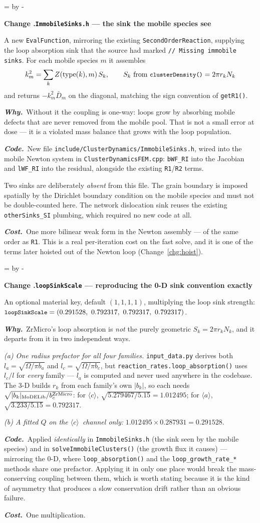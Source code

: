 \documentclass[11pt,a4paper]{article}
\newcommand{\code}[1]{\texttt{\small #1}}
\newcommand{\aloop}{\ensuremath{\langle a\rangle}}
\newcommand{\cloop}{\ensuremath{\langle c\rangle}}
\newcommand{\Om}{\ensuremath{\Omega}}
\newcommand{\needlines}[1]{%
  \par\dimen0=\pagegoal \advance\dimen0 by -\pagetotal
  \ifdim\dimen0<#1\baselineskip \newpage \fi}
\newcounter{chg}
\newcommand{\change}[1]{%
  \needlines{4}%
  \refstepcounter{chg}%
  \par\medskip\noindent
  {\bfseries\boldmath Change \thechg.\quad #1}%
  \par\nobreak\smallskip}
\newcommand{\why}[1]{\par\noindent\textbf{\itshape Why.}\ #1\par}
\newcommand{\impact}[1]{\par\noindent\textbf{\itshape Code.}\ #1\par}
\newcommand{\cost}[1]{\par\noindent\textbf{\itshape Cost.}\ #1\par}
\begin{document}
\change{\code{ImmobileSinks.h} --- the sink the mobile species see}
\label{chg:immobilesinks}
A new \code{EvalFunction}, mirroring the existing \code{SecondOrderReaction},
supplying the loop absorption sink that the source had marked
\code{// Missing immobile sinks}. For each mobile species $m$ it assembles
\[
  k^2_m = \sum_k Z(\text{type}(k), m)\, S_k , \qquad
  S_k \ \text{from}\ \code{clusterDensity()} = 2\pi r_k N_k
\]
and returns $-k^2_m \bar D_m$ on the diagonal, matching the sign convention of
\code{getR1()}.
\why{Without it the coupling is one-way: loops grow by absorbing mobile
defects that are never removed from the mobile pool. That is not a small
error at dose --- it is a violated mass balance that grows with the loop
population.}
\impact{New file \code{include/ClusterDynamics/ImmobileSinks.h}, wired into the
mobile Newton system in \code{ClusterDynamicsFEM.cpp}: \code{bWF\_RI} into the
Jacobian and \code{lWF\_RI} into the residual, alongside the existing
\code{R1}/\code{R2} terms.

Two sinks are deliberately \emph{absent} from this file. The grain boundary is
imposed spatially by the Dirichlet boundary condition on the mobile species and
must not be double-counted here. The network dislocation sink reuses the
existing \code{otherSinks\_SI} plumbing, which required no new code at all.}
\cost{One more bilinear weak form in the Newton assembly --- of the same order
as \code{R1}. This is a real per-iteration cost on the fast solve, and it is
one of the terms later hoisted out of the Newton loop
(Change~\ref{chg:hoist}).}

\change{\code{loopSinkScale} --- reproducing the 0-D sink convention exactly}
\label{chg:loopsinkscale}
An optional material key, default $(1,1,1,1)$, multiplying the loop sink
strength: $\code{loopSinkScale} = (0.291528,\ 0.792317,\ 0.792317,\ 0.792317)$.
\why{ZrMicro's loop absorption is \emph{not} the purely geometric
$S_k = 2\pi r_k N_k$, and it departs from it in two independent ways.

\emph{(a) One radius prefactor for all four families.} \code{input\_data.py}
derives both $l_a = \sqrt{\Om/\pi b_a}$ and $l_c = \sqrt{\Om/\pi b_c}$, but
\code{reaction\_rates.loop\_absorption()} uses $l_c/l$ for \emph{every}
family --- $l_a$ is computed and never used anywhere in the codebase. The 3-D
builds $r_k$ from each family's own $|b_k|$, so each needs
$\sqrt{|b_k|_{\rm MoDELib}/b_c^{\rm ZrMicro}}$: for \cloop,
$\sqrt{5.279467/5.15} = 1.012495$; for \aloop, $\sqrt{3.233/5.15} = 0.792317$.

\emph{(b) A fitted $Q$ on the \cloop\ channel only:}
$1.012495\times0.287931 = 0.291528$.}
\impact{Applied \emph{identically} in \code{ImmobileSinks.h} (the sink seen by
the mobile species) and in \code{solveImmobileClusters()} (the growth flux it
causes) --- mirroring the 0-D, where \code{loop\_absorption()} and the
\code{loop\_growth\_rate\_*} methods share one prefactor. Applying it in only
one place would break the mass-conserving coupling between them, which is
worth stating because it is the kind of asymmetry that produces a slow
conservation drift rather than an obvious failure.}
\cost{One multiplication.}
\end{document}
